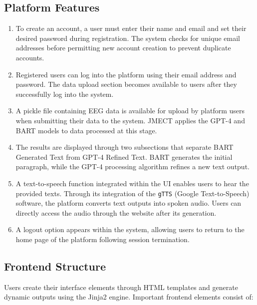 \documentclass[journal]{IEEEtran}
\begin{document}
\subsection{Platform Features}
\begin{enumerate}
	\item To create an account, a user must enter their name and email and set their desired password during registration. The system checks for unique email addresses before permitting new account creation to prevent duplicate accounts.
	\item Registered users can log into the platform using their email address and password. The data upload section becomes available to users after they successfully log into the system.
	\item A pickle file containing EEG data is available for upload by platform users when submitting their data to the system. JMECT applies the GPT-4 and BART models to data processed at this stage.
	\item The results are displayed through two subsections that separate BART Generated Text from GPT-4 Refined Text. BART generates the initial paragraph, while the GPT-4 processing algorithm refines a new text output.
	\item A text-to-speech function integrated within the UI enables users to hear the provided texts. Through its integration of the \texttt{gTTS} (Google Text-to-Speech) software, the platform converts text outputs into spoken audio. Users can directly access the audio through the website after its generation.
	\item A logout option appears within the system, allowing users to return to the home page of the platform following session termination.
\end{enumerate}

\subsection{Frontend Structure}
Users create their interface elements through HTML templates and generate dynamic outputs using the Jinja2 engine. Important frontend elements consist of:
\end{document}
